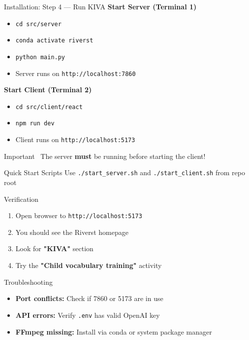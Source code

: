 \documentclass[aspectratio=169]{beamer}
\begin{document}
\begin{frame}{Installation: Step 4 — Run KIVA}
\textbf{Start Server (Terminal 1)}
\begin{itemize}
    \item \texttt{cd src/server}
    \item \texttt{conda activate riverst}
    \item \texttt{python main.py}
    \item Server runs on \texttt{http://localhost:7860}
\end{itemize}

\vspace{0.3cm}

\textbf{Start Client (Terminal 2)}
\begin{itemize}
    \item \texttt{cd src/client/react}
    \item \texttt{npm run dev}
    \item Client runs on \texttt{http://localhost:5173}
\end{itemize}

\vspace{0.3cm}

\begin{alertblock}{Important}
\faExclamationTriangle\ The server \textbf{must} be running before starting the client!
\end{alertblock}

\vspace{0.2cm}
\begin{block}{Quick Start Scripts}
Use \texttt{./start\_server.sh} and \texttt{./start\_client.sh} from repo root
\end{block}
\end{frame}

\begin{frame}{Verification}
\begin{enumerate}
    \item Open browser to \texttt{http://localhost:5173}
    \item You should see the Riverst homepage
    \item Look for \textbf{"KIVA"} section
    \item Try the \textbf{"Child vocabulary training"} activity
\end{enumerate}

\vspace{0.3cm}

\begin{block}{Troubleshooting}
\begin{itemize}
    \item \textbf{Port conflicts:} Check if 7860 or 5173 are in use
    \item \textbf{API errors:} Verify \texttt{.env} has valid OpenAI key
    \item \textbf{FFmpeg missing:} Install via conda or system package manager
\end{itemize}
\end{block}
\end{frame}
\end{document}
